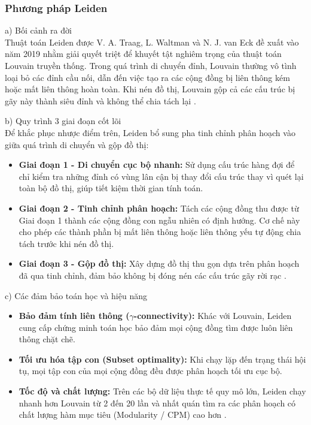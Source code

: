 \documentclass[14pt,a4paper]{extarticle}
\begin{document}
\subsubsection{Phương pháp Leiden}

\noindent a) Bối cảnh ra đời
\\
Thuật toán Leiden được V. A. Traag, L. Waltman và N. J. van Eck đề xuất vào năm 2019 nhằm giải quyết triệt để khuyết tật nghiêm trọng của thuật toán Louvain truyền thống. Trong quá trình di chuyển đỉnh, Louvain thường vô tình loại bỏ các đỉnh cầu nối, dẫn đến việc tạo ra các cộng đồng bị liên thông kém hoặc mất liên thông hoàn toàn. Khi nén đồ thị, Louvain gộp cả các cấu trúc bị gãy này thành siêu đỉnh và không thể chia tách lại \cite{Traag2019}.

\noindent b) Quy trình 3 giai đoạn cốt lõi
\\
Để khắc phục nhược điểm trên, Leiden bổ sung pha tinh chỉnh phân hoạch vào giữa quá trình di chuyển và gộp đồ thị:
\begin{itemize}
    \item \textbf{Giai đoạn 1 - Di chuyển cục bộ nhanh:} Sử dụng cấu trúc hàng đợi để chỉ kiểm tra những đỉnh có vùng lân cận bị thay đổi cấu trúc thay vì quét lại toàn bộ đồ thị, giúp tiết kiệm thời gian tính toán.
    \item \textbf{Giai đoạn 2 - Tinh chỉnh phân hoạch:} Tách các cộng đồng thu được từ Giai đoạn 1 thành các cộng đồng con ngẫu nhiên có định hướng. Cơ chế này cho phép các thành phần bị mất liên thông hoặc liên thông yếu tự động chia tách trước khi nén đồ thị.
    \item \textbf{Giai đoạn 3 - Gộp đồ thị:} Xây dựng đồ thị thu gọn dựa trên phân hoạch đã qua tinh chỉnh, đảm bảo không bị đóng nén các cấu trúc gãy rời rạc \cite{Traag2019}.
\end{itemize}

\noindent c) Các đảm bảo toán học và hiệu năng
\begin{itemize}
    \item \textbf{Bảo đảm tính liên thông ($\gamma$-connectivity):} Khác với Louvain, Leiden cung cấp chứng minh toán học bảo đảm mọi cộng đồng tìm được luôn liên thông chặt chẽ.
    \item \textbf{Tối ưu hóa tập con (Subset optimality):} Khi chạy lặp đến trạng thái hội tụ, mọi tập con của mọi cộng đồng đều được phân hoạch tối ưu cục bộ.
    \item \textbf{Tốc độ và chất lượng:} Trên các bộ dữ liệu thực tế quy mô lớn, Leiden chạy nhanh hơn Louvain từ 2 đến 20 lần và nhất quán tìm ra các phân hoạch có chất lượng hàm mục tiêu (Modularity / CPM) cao hơn \cite{Traag2019}.
\end{itemize}
\end{document}
